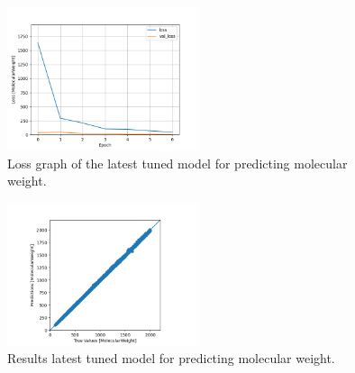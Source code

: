     \begin{figure}
        \centering
        \includegraphics[width=0.5\textwidth]{model_23_7_epochs_loss_MolecularWeight.png}
        \caption{Loss graph of the latest tuned model for predicting molecular weight.}
        \label{fig:model23-mol-weight-loss}
    \end{figure}
    \begin{figure}
        \centering
        \includegraphics[width=0.5\textwidth]{model_23_7_epochs_predictions_MolecularWeight.png}
        \caption{Results latest tuned model for predicting molecular weight.}
        \label{fig:model23-mol-weight-predictions}
    \end{figure}
    
